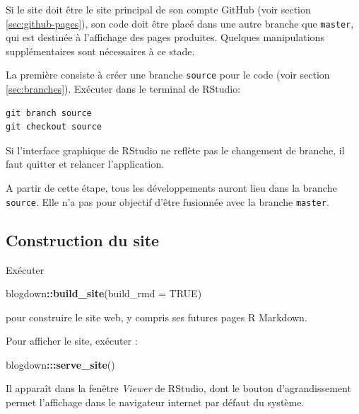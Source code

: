 \documentclass[
  12pt,
  french,
  a4paper,
  extrafontsizes,onecolumn,openright
  ]{memoir}
\newenvironment{Shaded}{\begin{snugshade}}{\end{snugshade}}
\newcommand{\DataTypeTok}[1]{\textcolor[rgb]{0.13,0.29,0.53}{#1}}
\newcommand{\KeywordTok}[1]{\textcolor[rgb]{0.13,0.29,0.53}{\textbf{#1}}}
\newcommand{\NormalTok}[1]{#1}
\newcommand{\OperatorTok}[1]{\textcolor[rgb]{0.81,0.36,0.00}{\textbf{#1}}}
\newcommand{\OtherTok}[1]{\textcolor[rgb]{0.56,0.35,0.01}{#1}}
\newlength{\rf}
\begin{document}
Si le site doit être le site principal de son compte GitHub (voir section \ref{sec:github-pages}), son code doit être placé dans une autre branche que \texttt{master}, qui est destinée à l'affichage des pages produites.
Quelques manipulations supplémentaires sont nécessaires à ce stade.

La première consiste à créer une branche \texttt{source} pour le code (voir section \ref{sec:branches}).
Exécuter dans le terminal de RStudio:

\begin{verbatim}
git branch source
git checkout source
\end{verbatim}

Si l'interface graphique de RStudio ne reflète pas le changement de branche, il faut quitter et relancer l'application.

A partir de cette étape, tous les développements auront lieu dans la branche \texttt{source}.
Elle n'a pas pour objectif d'être fusionnée avec la branche \texttt{master}.

\hypertarget{construction-du-site}{%
\subsection{Construction du site}\label{construction-du-site}}

Exécuter

\scriptsize

\begin{Shaded}
\begin{Highlighting}[]
\NormalTok{blogdown}\OperatorTok{::}\KeywordTok{build_site}\NormalTok{(}\DataTypeTok{build_rmd =} \OtherTok{TRUE}\NormalTok{)}
\end{Highlighting}
\end{Shaded}

\normalsize

pour construire le site web, y compris ses futures pages R Markdown.

Pour afficher le site, exécuter :

\scriptsize

\begin{Shaded}
\begin{Highlighting}[]
\NormalTok{blogdown}\OperatorTok{:::}\KeywordTok{serve_site}\NormalTok{()}
\end{Highlighting}
\end{Shaded}

\normalsize

Il apparaît dans la fenêtre \emph{Viewer} de RStudio, dont le bouton d'agrandissement permet l'affichage dans le navigateur internet par défaut du système.
\end{document}
